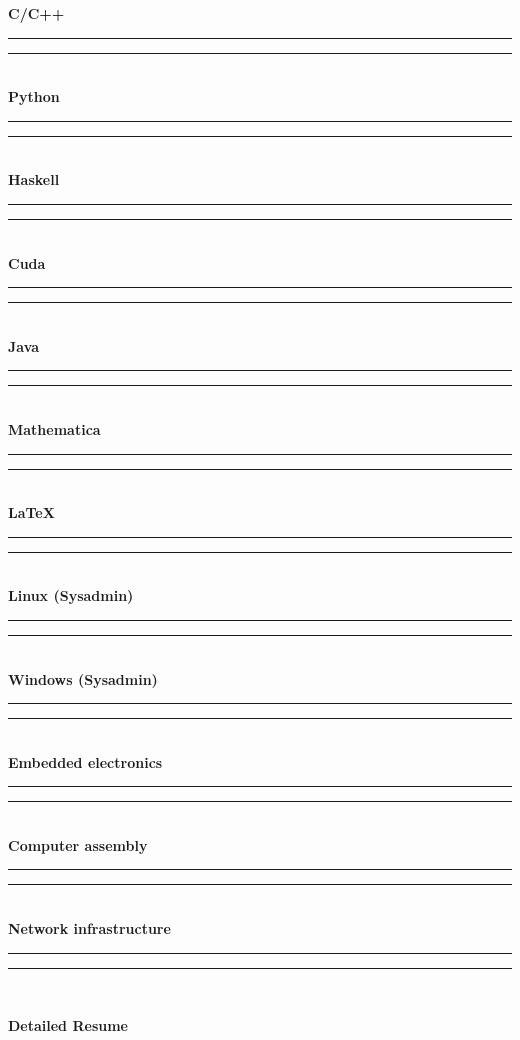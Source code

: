 \documentclass[a4paper]{article}
\newcommand{\crule}[3][black]{\textcolor{#1}{\rule{#2}{#3}}}
\newcommand{\progbar}[4][black]{\crule[#1]{#3}{#4}\crule[#1!10!white!90]{#2}{#4}}
\newcommand{\blockNp}[1]{\newpage \textbf{\Large #1} \vspace{0.2cm}}
\newcommand{\skillbar}[4]{\textbf{#1} \hfill \progbar{#2}{#3}{#4} \\}
\begin{document}
\begin{minipage}[t]{0.375\columnwidth}
    
    \skillbar{C/C++}
    {1.4cm}
    {0.6cm}
    {0.25cm}
    \skillbar{Python}
    {1.1cm}
    {0.9cm}
    {0.25cm}
    \skillbar{Haskell}
    {1.5cm}
    {0.5cm}
    {0.25cm}
    \skillbar{Cuda}
    {1.1cm}
    {0.9cm}
    {0.25cm}
    \skillbar{Java}
    {1.2cm}
    {0.8cm}
    {0.25cm}
    \skillbar{Mathematica}
    {1.4cm}
    {0.6cm}
    {0.25cm}
    \skillbar{\LaTeX}
    {0.5cm}
    {1.5cm}
    {0.25cm}
    \skillbar{Linux (Sysadmin)}
    {0.7cm}
    {1.3cm}
    {0.25cm}
    \skillbar{Windows (Sysadmin)}
    {0.7cm}
    {1.3cm}
    {0.25cm}
    \skillbar{Embedded electronics}
    {1.5cm}
    {0.5cm}
    {0.25cm}
    \skillbar{Computer assembly}
    {1.0cm}
    {1.0cm}
    {0.25cm}
    \skillbar{Network infrastructure}
    {1.6cm}
    {0.4cm}
    {0.25cm}




\end{minipage}




\blockNp{Detailed Resume}
\end{document}
